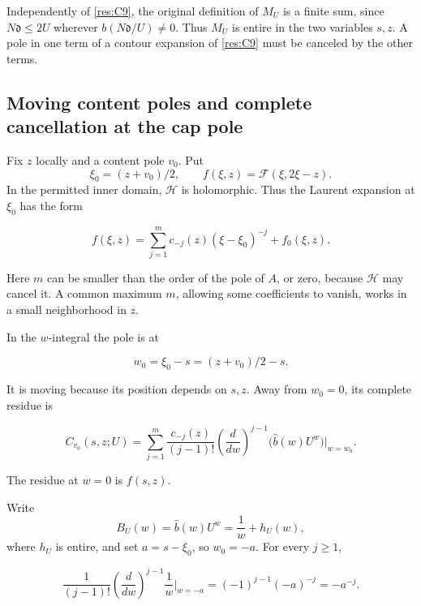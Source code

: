 \documentclass[11pt]{article}
\numberwithin{equation}{section}
\newcommand{\F}{\mathcal F}
\newcommand{\HH}{\mathcal H}
\begin{document}
Independently of \eqref{res:C9}, the original definition of \(M_U\) is a
finite sum, since \(N\mathfrak d\leq2U\) wherever
\(b(N\mathfrak d/U)\ne0\). Thus \(M_U\) is entire in the two variables
\(s,z\). A pole in one term of a contour expansion of \eqref{res:C9}
must be canceled by the other terms.

\subsection{Moving content poles and complete cancellation at the cap
pole}\label{moving-content-poles-and-complete-cancellation-at-the-cap-pole}

Fix \(z\) locally and a content pole \(v_0\). Put \[
 \xi_0=(z+v_0)/2,\qquad
 f(\xi,z)=\F(\xi,2\xi-z).
\] In the permitted inner domain, \(\HH\) is holomorphic. Thus the
Laurent expansion at \(\xi_0\) has the form

\begin{equation}\label{res:C10}
f(\xi,z)=\sum_{j=1}^{m}c_{-j}(z)(\xi-\xi_0)^{-j}
          +f_0(\xi,z).
\end{equation}

Here \(m\) can be smaller than the order of the pole of \(A\), or zero,
because \(\HH\) may cancel it. A common maximum \(m\), allowing some
coefficients to vanish, works in a small neighborhood in \(z\).

In the \(w\)-integral the pole is at

\begin{equation}\label{res:C11}
w_0=\xi_0-s=(z+v_0)/2-s.
\end{equation}

It is moving because its position depends on \(s,z\). Away from
\(w_0=0\), its complete residue is

\begin{equation}\label{res:C12}
C_{v_0}(s,z;U)
 =\sum_{j=1}^{m}\frac{c_{-j}(z)}{(j-1)!}
 \left(\frac{d}{dw}\right)^{j-1}
 \bigl(\widehat b(w)U^w\bigr)\bigg|_{w=w_0}.
\end{equation}

The residue at \(w=0\) is \(f(s,z)\).

Write \[
 B_U(w)=\widehat b(w)U^w=\frac1w+h_U(w),
\] where \(h_U\) is entire, and set \(a=s-\xi_0\), so \(w_0=-a\). For
every \(j\geq1\),

\begin{equation}\label{res:C13}
\frac1{(j-1)!}
 \left(\frac{d}{dw}\right)^{j-1}\frac1w\bigg|_{w=-a}
 =(-1)^{j-1}(-a)^{-j}=-a^{-j}.
\end{equation}
\end{document}
